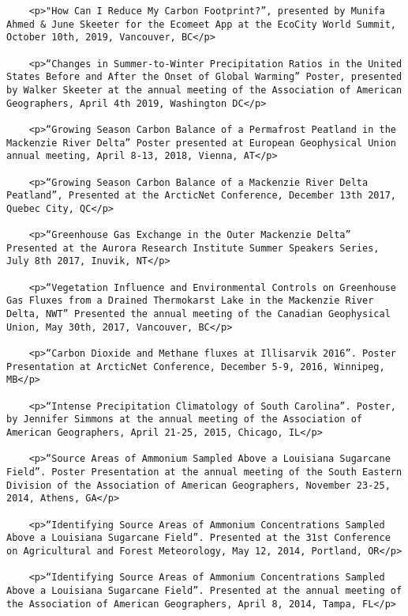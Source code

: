 \documentclass[
]{article}
\begin{document}
\begin{verbatim}
    <p>"How Can I Reduce My Carbon Footprint?”, presented by Munifa Ahmed & June Skeeter for the Ecomeet App at the EcoCity World Summit, October 10th, 2019, Vancouver, BC</p>
    
    <p>“Changes in Summer-to-Winter Precipitation Ratios in the United States Before and After the Onset of Global Warming” Poster, presented by Walker Skeeter at the annual meeting of the Association of American Geographers, April 4th 2019, Washington DC</p>
    
    <p>“Growing Season Carbon Balance of a Permafrost Peatland in the Mackenzie River Delta” Poster presented at European Geophysical Union annual meeting, April 8-13, 2018, Vienna, AT</p>
    
    <p>“Growing Season Carbon Balance of a Mackenzie River Delta Peatland”, Presented at the ArcticNet Conference, December 13th 2017, Quebec City, QC</p>
    
    <p>“Greenhouse Gas Exchange in the Outer Mackenzie Delta” Presented at the Aurora Research Institute Summer Speakers Series, July 8th 2017, Inuvik, NT</p>
    
    <p>“Vegetation Influence and Environmental Controls on Greenhouse Gas Fluxes from a Drained Thermokarst Lake in the Mackenzie River Delta, NWT” Presented the annual meeting of the Canadian Geophysical Union, May 30th, 2017, Vancouver, BC</p>
    
    <p>“Carbon Dioxide and Methane fluxes at Illisarvik 2016”. Poster Presentation at ArcticNet Conference, December 5-9, 2016, Winnipeg, MB</p>
    
    <p>“Intense Precipitation Climatology of South Carolina”. Poster, by Jennifer Simmons at the annual meeting of the Association of American Geographers, April 21-25, 2015, Chicago, IL</p>
    
    <p>“Source Areas of Ammonium Sampled Above a Louisiana Sugarcane Field”. Poster Presentation at the annual meeting of the South Eastern Division of the Association of American Geographers, November 23-25, 2014, Athens, GA</p>
    
    <p>“Identifying Source Areas of Ammonium Concentrations Sampled Above a Louisiana Sugarcane Field”. Presented at the 31st Conference on Agricultural and Forest Meteorology, May 12, 2014, Portland, OR</p>
    
    <p>“Identifying Source Areas of Ammonium Concentrations Sampled Above a Louisiana Sugarcane Field”. Presented at the annual meeting of the Association of American Geographers, April 8, 2014, Tampa, FL</p>
    

\end{verbatim}
\end{document}
